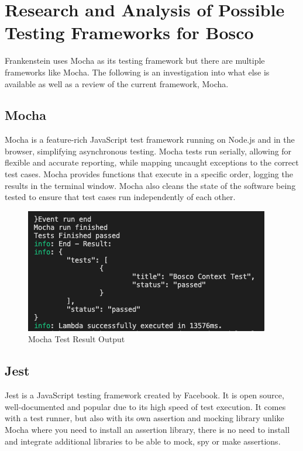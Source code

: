 \documentclass[12pt,a4paper,titlepage]{report}
\begin{document}
\section{Research and Analysis of Possible Testing Frameworks for Bosco}

Frankenstein uses Mocha as its testing framework but there are multiple frameworks like Mocha. The following is an investigation into what else is available as well as a review of the current framework, Mocha.
\subsection{Mocha}

Mocha is a feature-rich JavaScript test framework running on Node.js and in the browser, simplifying asynchronous
testing. Mocha tests run serially, allowing for flexible and accurate reporting, while mapping uncaught
exceptions to the correct test cases. Mocha provides functions that execute in a specific order, logging the
results in the terminal window. Mocha also cleans the state of the software being tested to ensure that test
cases run independently of each other.

\begin{figure}[ht]
  \centering
  \includegraphics[width=\textwidth,height=\textheight,keepaspectratio]{./diagrams/mocha_test_result.png}
  \caption{Mocha Test Result Output}
\end{figure}

\subsection{Jest}

Jest is a JavaScript testing framework created by Facebook. It is open source, well-documented and popular due to its
high speed of test execution. It comes with a test runner, but also with its own assertion and mocking library unlike Mocha where you need to install an assertion
library, there is no need to install and integrate additional libraries to be able to mock, spy or make assertions.
\end{document}
